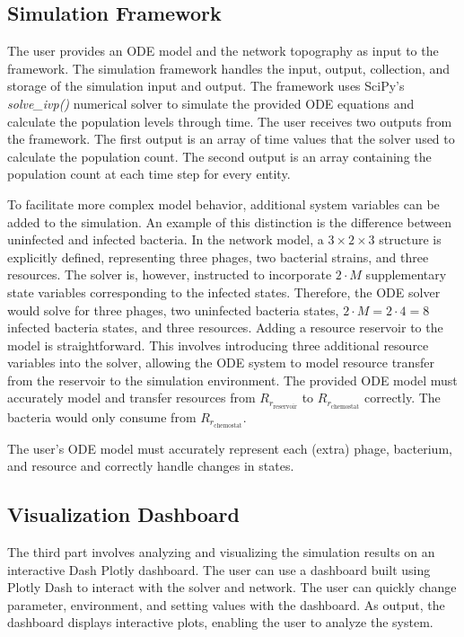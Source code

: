 \subsection{Simulation Framework} 
\label{sec:simulation_framework}
The user provides an ODE model and the network topography as input to the framework. 
The simulation framework handles the input, output, collection, and storage of the simulation input and output.
The framework uses SciPy’s \cite{virtanenSciPy10Fundamental2020} \textit{solve\_ivp()} numerical solver \cite{ dormandFamilyEmbeddedRungeKutta1980} to simulate the provided ODE equations and calculate the population levels through time.
The user receives two outputs from the framework. 
The first output is an array of time values that the solver used to calculate the population count.
The second output is an array containing the population count at each time step for every entity.

To facilitate more complex model behavior, additional system variables can be added to the simulation.  
An example of this distinction is the difference between uninfected and infected bacteria. 
In the network model, a $3\times 2 \times 3$ structure is explicitly defined, representing three phages, two bacterial strains, and three resources. 
The solver is, however, instructed to incorporate $2\cdot M$ supplementary state variables corresponding to the infected states.
Therefore, the ODE solver would solve for three phages, two uninfected bacteria states, $2\cdot M = 2\cdot 4 = 8$ infected bacteria states, and three resources. 
Adding a resource reservoir to the model is straightforward. 
This involves introducing three additional resource variables into the solver, allowing the ODE system to model resource transfer from the reservoir to the simulation environment.
The provided ODE model must accurately model and transfer resources from $R_{r_{\text{reservoir}}}$ to $R_{r_{\text{chemostat}}}$ correctly. 
The bacteria would only consume from $R_{r_{\text{chemostat}}}$. 

The user’s ODE model must accurately represent each (extra) phage, bacterium, and resource and correctly handle changes in states. 

\subsection{Visualization Dashboard}
\label{sec:visualization_framework}
The third part involves analyzing and visualizing the simulation results on an interactive Dash Plotly \cite{DashDocumentationUser} dashboard. 
The user can use a dashboard built using Plotly Dash to interact with the solver and network.
The user can quickly change parameter, environment, and setting values with the dashboard. 
As output, the dashboard displays interactive plots, enabling the user to analyze the system. 

